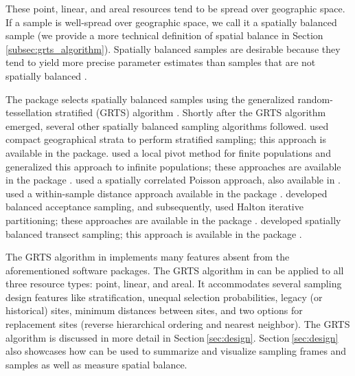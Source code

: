 \documentclass[
  shortnames]{jss}
\begin{document}
These point, linear, and areal resources tend to be spread over
geographic space. If a sample is well-spread over geographic space, we
call it a spatially balanced sample (we provide a more technical
definition of spatial balance in
Section\(~\)\ref{subsec:grts_algorithm}). Spatially balanced samples are
desirable because they tend to yield more precise parameter estimates
than samples that are not spatially balanced
\citep{stevens2004grts, barabesi2011sampling, grafstrom2013well, robertson2013bas, wang2013design, benedetti2017spatiallyreview}.

The  package selects spatially balanced samples using the
generalized random-tessellation stratified (GRTS) algorithm
\citep{stevens2004grts}. Shortly after the GRTS algorithm emerged,
several other spatially balanced sampling algorithms followed.
\citet{walvoort2010r} used compact geographical strata to perform
stratified sampling; this approach is available in the 
 package. \citet{grafstrom2012spatially} used a local pivot
method for finite populations and \citet{grafstrom2018spatially}
generalized this approach to infinite populations; these approaches are
available in the   package
\citep{grafstrom2019BalancedSampling}.
\citet{grafstrom2012spatiallypoisson} used a spatially correlated
Poisson approach, also available in .
\citet{benedetti2017spatially} used a within-sample distance approach
available in the   package
\citep{pantalone2022spbsampling}. \citet{robertson2013bas} developed
balanced acceptance sampling, and subsequently,
\citet{robertson2018halton} used Halton iterative partitioning; these
approaches are available in the   package
\citep{mcdonald2020SDraw}. \citet{foster2020spatially} developed
spatially balanced transect sampling; this approach is available in the
  package \citep{foster2021mbhdesign}.

The GRTS algorithm in  implements many features absent
from the aforementioned software packages. The GRTS algorithm in
 can be applied to all three resource types: point,
linear, and areal. It accommodates several sampling design features like
stratification, unequal selection probabilities, legacy (or historical)
sites, minimum distances between sites, and two options for replacement
sites (reverse hierarchical ordering and nearest neighbor). The GRTS
algorithm is discussed in more detail in Section\(~\)\ref{sec:design}.
Section\(~\)\ref{sec:design} also showcases how  can be
used to summarize and visualize sampling frames and samples as well as
measure spatial balance.
\end{document}
